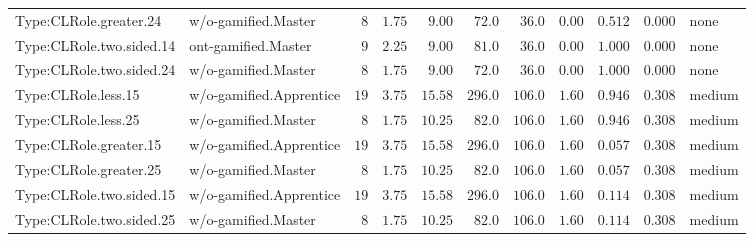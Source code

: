 \documentclass[6pt,a4paper]{article}
\begin{document}
{\begin{longtable}{llrrrrrrrrl}
Type:CLRole.greater.24&w/o-gamified.Master&$ 8$&$1.75$&$ 9.00$&$ 72.0$&$ 36.0$&$ 0.00$&$0.512$&$0.000$&none\tabularnewline
Type:CLRole.two.sided.14&ont-gamified.Master&$ 9$&$2.25$&$ 9.00$&$ 81.0$&$ 36.0$&$ 0.00$&$1.000$&$0.000$&none\tabularnewline
Type:CLRole.two.sided.24&w/o-gamified.Master&$ 8$&$1.75$&$ 9.00$&$ 72.0$&$ 36.0$&$ 0.00$&$1.000$&$0.000$&none\tabularnewline
Type:CLRole.less.15&w/o-gamified.Apprentice&$19$&$3.75$&$15.58$&$296.0$&$106.0$&$ 1.60$&$0.946$&$0.308$&medium\tabularnewline
Type:CLRole.less.25&w/o-gamified.Master&$ 8$&$1.75$&$10.25$&$ 82.0$&$106.0$&$ 1.60$&$0.946$&$0.308$&medium\tabularnewline
Type:CLRole.greater.15&w/o-gamified.Apprentice&$19$&$3.75$&$15.58$&$296.0$&$106.0$&$ 1.60$&$0.057$&$0.308$&medium\tabularnewline
Type:CLRole.greater.25&w/o-gamified.Master&$ 8$&$1.75$&$10.25$&$ 82.0$&$106.0$&$ 1.60$&$0.057$&$0.308$&medium\tabularnewline
\newpage
Type:CLRole.two.sided.15&w/o-gamified.Apprentice&$19$&$3.75$&$15.58$&$296.0$&$106.0$&$ 1.60$&$0.114$&$0.308$&medium\tabularnewline
Type:CLRole.two.sided.25&w/o-gamified.Master&$ 8$&$1.75$&$10.25$&$ 82.0$&$106.0$&$ 1.60$&$0.114$&$0.308$&medium\tabularnewline
\hline
\end{longtable}}
\end{document}
